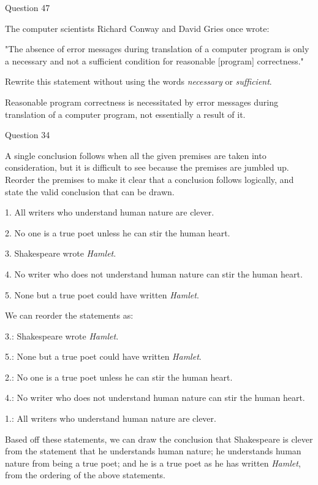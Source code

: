 \documentclass{article}
\begin{document}
\clearpage
{} Question 47
\item[]The computer scientists Richard Conway and David Gries once wrote:
\item[]"The absence of error messages during translation of a computer program is only a necessary and not a sufficient condition for reasonable [program] correctness."
\item[]Rewrite this statement without using the words \textit{necessary} or \textit{sufficient}.
\item[]Reasonable program correctness is necessitated by error messages during translation of a computer program, not essentially a result of it.



\clearpage
{} Question 34
\item[]A single conclusion follows when all the given premises are taken into consideration, but it is difficult to see because the premises are jumbled up. Reorder the premises to make it clear that a conclusion follows logically, and state the valid conclusion that can be drawn.
\item[]1. All writers who understand human nature are clever.
\item[]2. No one is a true poet unless he can stir the human heart.
\item[]3. Shakespeare wrote \textit{Hamlet}.
\item[]4. No writer who does not understand human nature can stir the human heart.
\item[]5. None but a true poet could have written \textit{Hamlet}.
\item[]
\item[]We can reorder the statements as: 
\item[]3.: Shakespeare wrote \textit{Hamlet}.
\item[]5.: None but a true poet could have written \textit{Hamlet}.
\item[]2.: No one is a true poet unless he can stir the human heart.
\item[]4.: No writer who does not understand human nature can stir the human heart.
\item[]1.: All writers who understand human nature are clever.
\item[]Based off these statements, we can draw the conclusion that Shakespeare is clever from the statement that he understands human nature; he understands human nature from being a true poet; and he is a true poet as he has written \textit{Hamlet}, from the ordering of the above statements.
\end{document}
